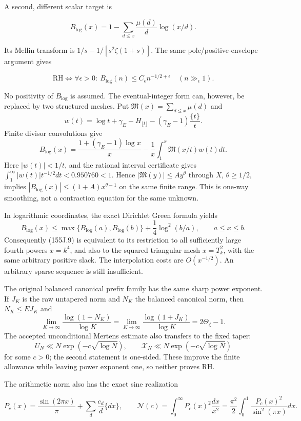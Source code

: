 \documentclass[
  11pt,
]{book}
\begin{document}
A second, different scalar target is

\[
B_{\log}(x)=1-\sum_{d\le x}\frac{\mu(d)}d\log(x/d).
\tag{155J.8}
\]

Its Mellin transform is \(1/s-1/[s^2\zeta(1+s)]\). The same
pole/positive-envelope argument gives

\[
\boxed{\mathrm{RH}\iff
\forall\epsilon>0:\ B_{\log}(n)\le
C_\epsilon n^{-1/2+\epsilon}\quad(n\gg_\epsilon1).}
\tag{155J.9}
\]

No positivity of \(B_{\log}\) is assumed. The eventual-integer form can,
however, be replaced by two structured meshes. Put
\(\mathfrak M(x)=\sum_{d\le x}\mu(d)\) and \[
w(t)=\log t+\gamma_E-H_{\lfloor t\rfloor}
-(\gamma_E-1)\frac{\{t\}}t.
\tag{155J.9a}
\] Finite divisor convolutions give \[
\boxed{B_{\log}(x)=\frac{1+(\gamma_E-1)\log x}{x}
-\frac1x\int_1^x\mathfrak M(x/t)w(t)dt.}
\tag{155J.9b}
\] Here \(|w(t)|<1/t\), and the rational interval certificate gives
\(\int_1^\infty|w(t)|t^{-1/2}dt<0.950760<1\). Hence
\(|\mathfrak M(y)|\le Ay^\theta\) through \(X\), \(\theta\ge1/2\),
implies \(|B_{\log}(x)|\le(1+A)x^{\theta-1}\) on the same finite range.
This is one-way smoothing, not a contraction equation for the same
unknown.

In logarithmic coordinates, the exact Dirichlet Green formula yields \[
B_{\log}(x)\le\max\{B_{\log}(a),B_{\log}(b)\}
+\frac14\log^2(b/a),\qquad a\le x\le b.
\tag{155J.9c}
\] Consequently (155J.9) is equivalent to its restriction to all
sufficiently large fourth powers \(x=k^4\), and also to the squared
triangular mesh \(x=T_k^2\), with the same arbitrary positive slack. The
interpolation costs are \(O(x^{-1/2})\). An arbitrary sparse sequence is
still insufficient.

The original balanced canonical prefix family has the same sharp power
exponent. If \(J_K\) is the raw untapered norm and \(N_K\) the balanced
canonical norm, then \(N_K\le EJ_K\) and \[
\boxed{\lim_{K\to\infty}\frac{\log(1+N_K)}{\log K}
=\lim_{K\to\infty}\frac{\log(1+J_K)}{\log K}
=2\Theta_\zeta-1.}
\tag{155J.9d}
\] The accepted unconditional Mertens estimate also transfers to the
fixed taper: \[
\boxed{U_N\ll N\exp(-c\sqrt{\log N}),\qquad
\mathcal X_N\ll N\exp(-c\sqrt{\log N})}
\tag{155J.9e}
\] for some \(c>0\); the second statement is one-sided. These improve
the finite allowance while leaving power exponent one, so neither proves
RH.

The arithmetic norm also has the exact sine realization

\[
P_c(x)=\frac{\sin(2\pi x)}\pi+\sum_d\frac{c_d}{d}\{dx\},
\qquad
\boxed{\mathscr N(c)=\int_0^\infty P_c(x)^2\frac{dx}{x^2}
=\frac{\pi^2}{2}\int_0^1\frac{P_c(x)^2}{\sin^2(\pi x)}dx.}
\tag{155J.10}
\]
\end{document}
